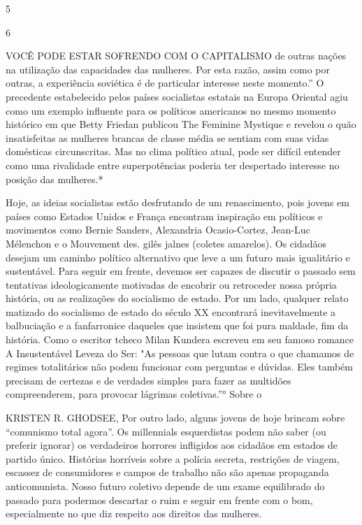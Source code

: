  \par 
5
 \par 
6
 \par 
VOCÊ PODE ESTAR SOFRENDO COM O CAPITALISMO de outras nações na utilização das capacidades das mulheres. Por esta razão, assim como por outras, a experiência soviética é de particular interesse neste momento.” O precedente estabelecido pelos países socialistas estatais na Europa Oriental agiu como um exemplo influente para os políticos americanos no mesmo momento histórico em que Betty Friedan publicou The Feminine Mystique e revelou o quão insatisfeitas as mulheres brancas de classe média se sentiam com suas vidas domésticas circunscritas. Mas no clima político atual, pode ser difícil entender como uma rivalidade entre superpotências poderia ter despertado interesse no posição das mulheres.*
 \par 
Hoje, as ideias socialistas estão desfrutando de um renascimento, pois jovens em países como Estados Unidos e França encontram inspiração em políticos e movimentos como Bernie Sanders, Alexandria Ocasio-Cortez, Jean-Luc Mélenchon e o Mouvement des. gilês jalnes (coletes amarelos). Os cidadãos desejam um caminho político alternativo que leve a um futuro mais igualitário e sustentável. Para seguir em frente, devemos ser capazes de discutir o passado sem tentativas ideologicamente motivadas de encobrir ou retroceder nossa própria história, ou as realizações do socialismo de estado. Por um lado, qualquer relato matizado do socialismo de estado do século XX encontrará inevitavelmente a balbuciação e a fanfarronice daqueles que insistem que foi pura maldade, fim da história. Como o escritor tcheco Milan Kundera escreveu em seu famoso romance A Insustentável Leveza do Ser: "As pessoas que lutam contra o que chamamos de regimes totalitários não podem funcionar com perguntas e dúvidas. Eles também precisam de certezas e de verdades simples para fazer as multidões compreenderem, para provocar lágrimas coletivas.”° Sobre o
 \par 
KRISTEN R. GHODSEE, Por outro lado, alguns jovens de hoje brincam sobre “comunismo total agora”. Os millennials esquerdistas podem não saber (ou preferir ignorar) os verdadeiros horrores infligidos aos cidadãos em estados de partido único. Histórias horríveis sobre a polícia secreta, restrições de viagem, escassez de consumidores e campos de trabalho não são apenas propaganda anticomunista. Nosso futuro coletivo depende de um exame equilibrado do passado para podermos descartar o ruim e seguir em frente com o bom, especialmente no que diz respeito aos direitos das mulheres.

